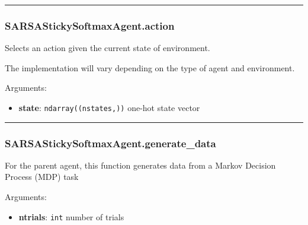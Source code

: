 \begin{center}\rule{0.5\linewidth}{\linethickness}\end{center}

\subsubsection{SARSAStickySoftmaxAgent.action}\label{sarsastickysoftmaxagent.action}

\begin{Shaded}
\begin{Highlighting}[]
\end{Highlighting}
\end{Shaded}

Selects an action given the current state of environment.

The implementation will vary depending on the type of agent and
environment.

Arguments:

\begin{itemize}
\tightlist
\item
  \textbf{state}: \texttt{ndarray((nstates,))} one-hot state vector
\end{itemize}

\begin{center}\rule{0.5\linewidth}{\linethickness}\end{center}

\subsubsection{SARSAStickySoftmaxAgent.generate\_data}\label{sarsastickysoftmaxagent.generate_data}

\begin{Shaded}
\begin{Highlighting}[]
\end{Highlighting}
\end{Shaded}

For the parent agent, this function generates data from a Markov
Decision Process (MDP) task

Arguments:

\begin{itemize}
\tightlist
\item
  \textbf{ntrials}: \texttt{int} number of trials
\end{itemize}

